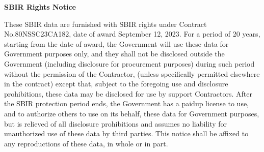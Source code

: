 \documentclass[class=Report, crop=false]{standalone}
\makeatletter
\let\thetitle\@title
\makeatother
\begin{document}
  \vspace*{0.5cm}
  \begin{center} \Huge \bfseries \thetitle \end{center}
  \vspace*{1.0cm}
  
  \noindent\small {\bfseries SBIR Rights Notice}

  \noindent These SBIR data are furnished with SBIR rights under Contract No.80NSSC23CA182, 
  date of award September 12, 2023. For a period of 20 years, starting from the date of award, 
  the Government will use these data for Government purposes only, and they shall not be 
  disclosed outside the Government (including disclosure for procurement purposes) during 
  such period without the permission of the Contractor, (unless specifically permitted 
  elsewhere in the contract) except that, subject to the foregoing use and disclosure 
  prohibitions, these data may be disclosed for use by support Contractors. After the SBIR 
  protection period ends, the Government has a paidup license to use, and to authorize others 
  to use on its behalf, these data for Government purposes, but is relieved of all disclosure 
  prohibitions and assumes no liability for unauthorized use of these data by third parties. 
  This notice shall be affixed to any reproductions of these data, in whole or in part.

  \vspace*{0.5cm}
\end{document}
